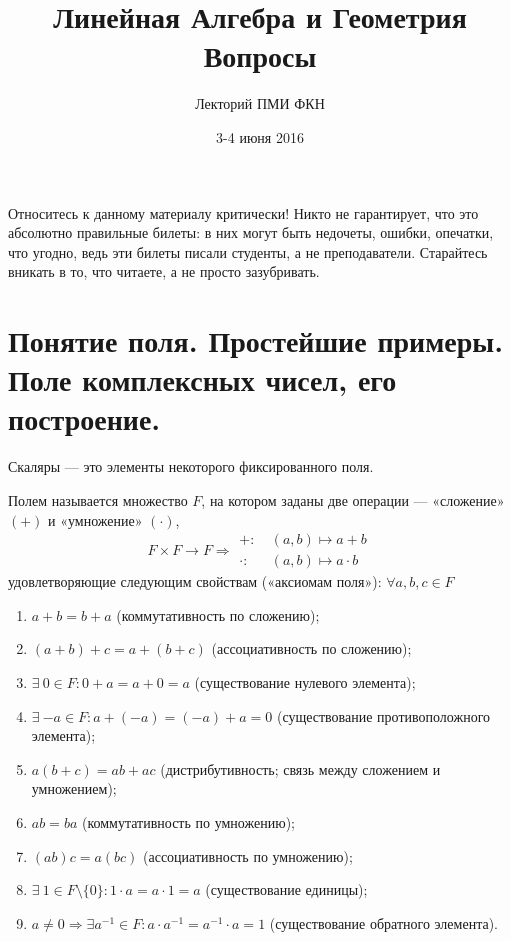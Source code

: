 
 
\title{Линейная Алгебра и Геометрия\\Вопросы}
\author{Лекторий ПМИ ФКН}
\date{3-4 июня 2016}


\maketitle

\begin{center}
\huge{Относитесь к данному материалу критически! Никто не гарантирует, что это абсолютно правильные билеты: в них могут быть недочеты, ошибки, опечатки, что угодно, ведь эти билеты писали студенты, а не преподаватели. Старайтесь вникать в то, что читаете, а не просто зазубривать.}
\end{center}

\tableofcontents
\newpage

\section{Понятие поля. Простейшие примеры. Поле комплексных чисел, его построение.}

\begin{Def}
Скаляры — это элементы некоторого фиксированного поля. 
\end{Def}

\begin{Def}
Полем называется множество $F$, на котором заданы две операции —  «сложение» $(+)$ и «умножение» $(\cdot)$,
\[
F \times F \rightarrow F \Rightarrow
\begin{aligned}
+\!:\:& (a, b) \mapsto a + b \\
\cdot:\:& (a, b) \mapsto a \cdot b
\end{aligned}
\]
удовлетворяющие следующим свойствам («аксиомам поля»): $\forall a, b, c \in F$
\begin{enumerate}
\item $a + b = b + a$ (коммутативность по сложению);
\item $(a + b) + c = a + (b + c)$ (ассоциативность по сложению);
\item $\exists\: 0 \in F \colon 0 + a = a + 0 = a$ (существование нулевого элемента);
\item $\exists\: {-a} \in F\colon a + (-a) = (-a) + a = 0$ (существование противоположного элемента);
\item $a(b + c) = ab + ac$ (дистрибутивность; связь между сложением и умножением);
\item $ab = ba$ (коммутативность по умножению);
\item $(ab)c = a(bc)$ (ассоциативность по умножению);
\item $\exists\: 1 \in F\setminus\{0\} : 1 \cdot a = a \cdot 1 = a$ (существование единицы);
\item $a \neq 0 \Rightarrow \exists a^{-1} \in F : a \cdot a^{-1} = a ^{-1} \cdot a = 1$ (существование обратного элемента).
\end{enumerate}
\end{Def}

